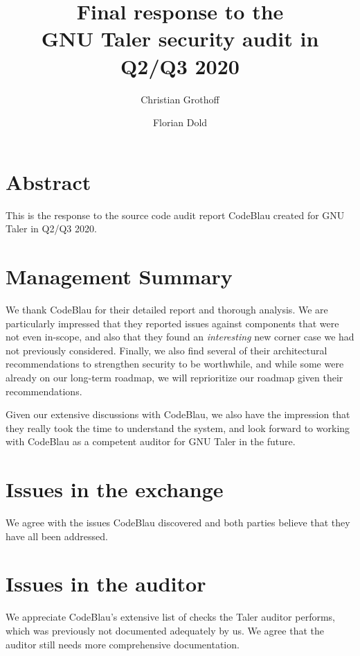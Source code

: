 \documentclass[11pt]{article}
\begin{document}
\pagestyle{headings}
\title{Final response to the \\ GNU Taler security audit in Q2/Q3 2020}
\author{Christian Grothoff \and Florian Dold}

\maketitle

\section{Abstract}

This is the response to the source code audit report CodeBlau
created for GNU Taler in Q2/Q3 2020.

\section{Management Summary}

We thank CodeBlau for their detailed report and thorough analysis. We are
particularly impressed that they reported issues against components that were
not even in-scope, and also that they found an {\em interesting} new corner
case we had not previously considered. Finally, we also find several of their
architectural recommendations to strengthen security to be worthwhile, and
while some were already on our long-term roadmap, we will reprioritize our
roadmap given their recommendations.

Given our extensive discussions with CodeBlau, we also have the impression
that they really took the time to understand the system, and look forward
to working with CodeBlau as a competent auditor for GNU Taler in the future.

\section{Issues in the exchange}

We agree with the issues CodeBlau discovered and both parties believe that
they have all been addressed.

\section{Issues in the auditor}

We appreciate CodeBlau's extensive list of checks the Taler auditor performs,
which was previously not documented adequately by us. We agree that the
auditor still needs more comprehensive documentation.
\end{document}
